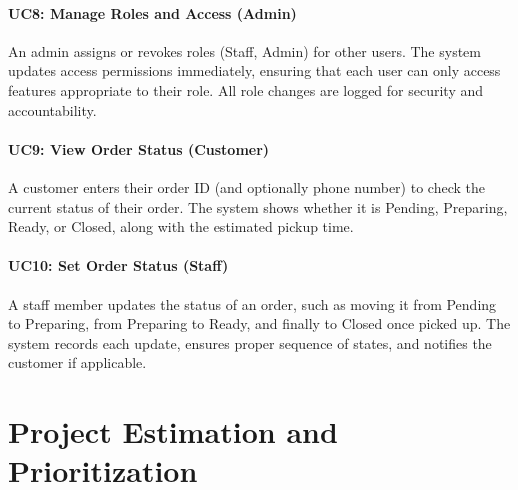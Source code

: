 \documentclass{article}
\begin{document}
\paragraph{UC8: Manage Roles and Access (Admin)}  
An admin assigns or revokes roles (Staff, Admin) for other users. The system updates access permissions immediately, ensuring that each user can only access features appropriate to their role. All role changes are logged for security and accountability.

\paragraph{UC9: View Order Status (Customer)}  
A customer enters their order ID (and optionally phone number) to check the current status of their order. The system shows whether it is Pending, Preparing, Ready, or Closed, along with the estimated pickup time.

\paragraph{UC10: Set Order Status (Staff)}  
A staff member updates the status of an order, such as moving it from Pending to Preparing, from Preparing to Ready, and finally to Closed once picked up. The system records each update, ensures proper sequence of states, and notifies the customer if applicable.

\section{Project Estimation and Prioritization}
\end{document}
